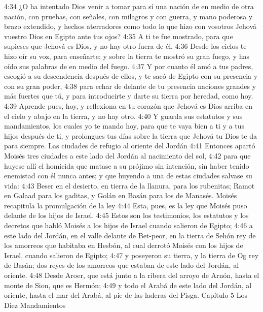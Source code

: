 4:34 ¿O ha intentado Dios venir a tomar para sí una nación de en medio de otra nación, con pruebas, con señales, con milagros y con guerra, y mano poderosa y brazo extendido, y hechos aterradores como todo lo que hizo con vosotros Jehová vuestro Dios en Egipto ante tus ojos?  
4:35 A ti te fue mostrado, para que supieses que Jehová es Dios, y no hay otro fuera de él.  
4:36 Desde los cielos te hizo oír su voz, para enseñarte; y sobre la tierra te mostró su gran fuego, y has oído sus palabras de en medio del fuego.  
4:37 Y por cuanto él amó a tus padres, escogió a su descendencia después de ellos, y te sacó de Egipto con su presencia y con su gran poder,  
4:38 para echar de delante de tu presencia naciones grandes y más fuertes que tú, y para introducirte y darte su tierra por heredad, como hoy.  
4:39 Aprende pues, hoy, y reflexiona en tu corazón que Jehová es Dios arriba en el cielo y abajo en la tierra, y no hay otro.  
4:40 Y guarda sus estatutos y sus mandamientos, los cuales yo te mando hoy, para que te vaya bien a ti y a tus hijos después de ti, y prolongues tus días sobre la tierra que Jehová tu Dios te da para siempre.  
Las ciudades de refugio al oriente del Jordán  
4:41 Entonces apartó Moisés tres ciudades a este lado del Jordán al nacimiento del sol,  
4:42 para que huyese allí el homicida que matase a su prójimo sin intención, sin haber tenido enemistad con él nunca antes; y que huyendo a una de estas ciudades salvase su vida:  
4:43 Beser en el desierto, en tierra de la llanura, para los rubenitas; Ramot en Galaad para los gaditas, y Golán en Basán para los de Manasés.  
Moisés recapitula la promulgación de la ley  
4:44 Esta, pues, es la ley que Moisés puso delante de los hijos de Israel.  
4:45 Estos son los testimonios, los estatutos y los decretos que habló Moisés a los hijos de Israel cuando salieron de Egipto;  
4:46 a este lado del Jordán, en el valle delante de Bet-peor, en la tierra de Sehón rey de los amorreos que habitaba en Hesbón, al cual derrotó Moisés con los hijos de Israel, cuando salieron de Egipto;  
4:47 y poseyeron su tierra, y la tierra de Og rey de Basán; dos reyes de los amorreos que estaban de este lado del Jordán, al oriente. 
4:48 Desde Aroer, que está junto a la ribera del arroyo de Arnón, hasta el monte de Sion, que es Hermón; 
4:49 y todo el Arabá de este lado del Jordán, al oriente, hasta el mar del Arabá, al pie de las laderas del Pisga.  
Capítulo 5 
Los Diez Mandamientos   

